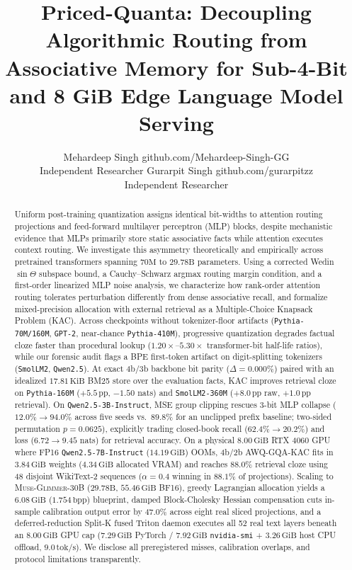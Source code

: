 \documentclass[10pt]{article} %
\title{Priced-Quanta: Decoupling Algorithmic Routing from Associative Memory for Sub-4-Bit and 8 GiB Edge Language Model Serving}
\author{\name Mehardeep Singh \email github.com/Mehardeep-Singh-GG \\
      \addr Independent Researcher
      \AND
      \name Gurarpit Singh \email github.com/gurarpitzz \\
      \addr Independent Researcher}
\newcommand{\kac}{\textsc{KAC}}
\newcommand{\gqakac}{\textsc{GQA-KAC}}
\newcommand{\glimmer}{\textsc{Muse-Glimmer-30B}}
\newcommand{\bpp}{\mathrm{bpp}}
\begin{document}
\maketitle

\begin{abstract}
Uniform post-training quantization assigns identical bit-widths to attention routing projections and feed-forward multilayer perceptron (MLP) blocks, despite mechanistic evidence that MLPs primarily store static associative facts while attention executes context routing. We investigate this asymmetry theoretically and empirically across pretrained transformers spanning $70\text{M}$ to $29.78\text{B}$ parameters. Using a corrected Wedin $\sin\Theta$ subspace bound, a Cauchy--Schwarz argmax routing margin condition, and a first-order linearized MLP noise analysis, we characterize how rank-order attention routing tolerates perturbation differently from dense associative recall, and formalize mixed-precision allocation with external retrieval as a Multiple-Choice Knapsack Problem (\kac{}). Across checkpoints without tokenizer-floor artifacts (\texttt{Pythia-70M/160M}, \texttt{GPT-2}, near-chance \texttt{Pythia-410M}), progressive quantization degrades factual cloze faster than procedural lookup ($1.20\times$--$5.30\times$ transformer-bit half-life ratios), while our forensic audit flags a BPE first-token artifact on digit-splitting tokenizers (\texttt{SmolLM2}, \texttt{Qwen2.5}). At exact 4b/3b backbone bit parity ($\Delta=0.000\%$) paired with an idealized $17.81\,\text{KiB}$ BM25 store over the evaluation facts, \kac{} improves retrieval cloze on \texttt{Pythia-160M} ($+5.5\,\text{pp}$, $-1.50$ nats) and \texttt{SmolLM2-360M} ($+8.0\,\text{pp}$ raw, $+1.0\,\text{pp}$ retrieval). On \texttt{Qwen2.5-3B-Instruct}, MSE group clipping rescues 3-bit MLP collapse ($12.0\% \to 94.0\%$ across five seeds vs.\ $89.8\%$ for an unclipped prefix baseline; two-sided permutation $p=0.0625$), explicitly trading closed-book recall ($62.4\% \to 20.2\%$) and loss ($6.72 \to 9.45$ nats) for retrieval accuracy. On a physical $8.00\,\text{GiB}$ RTX 4060 GPU where FP16 \texttt{Qwen2.5-7B-Instruct} ($14.19\,\text{GiB}$) OOMs, 4b/2b AWQ-\gqakac{} fits in $3.84\,\text{GiB}$ weights ($4.34\,\text{GiB}$ allocated VRAM) and reaches $88.0\%$ retrieval cloze using 48 disjoint WikiText-2 sequences ($\alpha=0.4$ winning in $88.1\%$ of projections). Scaling to \glimmer{} ($29.78\text{B}$, $55.46\,\text{GiB}$ BF16), greedy Lagrangian allocation yields a $6.08\,\text{GiB}$ ($1.754\,\bpp$) blueprint, damped Block-Cholesky Hessian compensation cuts in-sample calibration output error by $47.0\%$ across eight real sliced projections, and a deferred-reduction Split-K fused Triton daemon executes all 52 real text layers beneath an $8.00\,\text{GiB}$ GPU cap ($7.29\,\text{GiB}$ PyTorch / $7.92\,\text{GiB}$ \texttt{nvidia-smi} + $3.26\,\text{GiB}$ host CPU offload, $9.0\,\text{tok/s}$). We disclose all preregistered misses, calibration overlaps, and protocol limitations transparently.
\end{abstract}
\end{document}
